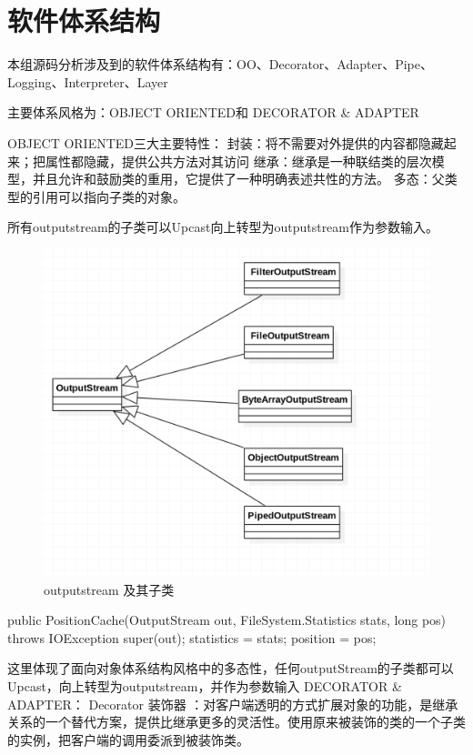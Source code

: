 \section{软件体系结构}
\label{sec:sa}

本组源码分析涉及到的软件体系结构有：OO、Decorator、Adapter、Pipe、Logging、Interpreter、Layer

主要体系风格为：OBJECT ORIENTED和 DECORATOR \& ADAPTER

OBJECT ORIENTED三大主要特性：
封装：将不需要对外提供的内容都隐藏起来；把属性都隐藏，提供公共方法对其访问
继承：继承是一种联结类的层次模型，并且允许和鼓励类的重用，它提供了一种明确表述共性的方法。
多态：父类型的引用可以指向子类的对象。

所有outputstream的子类可以Upcast向上转型为outputstream作为参数输入。
\begin{figure}[h]
\centering
\includegraphics[width =1\linewidth]{output.png}
\caption{outputstream 及其子类}
\label{fig:sa:OutputStream}
\end{figure}
\begin{java}
public PositionCache(OutputStream out,
                     FileSystem.Statistics stats,
                     long pos) throws IOException {
  super(out);
  statistics = stats;
  position = pos;
}
\end{java}
这里体现了面向对象体系结构风格中的多态性，任何outputStream的子类都可以Upcast，向上转型为outputstream，并作为参数输入
DECORATOR \& ADAPTER：
Decorator 装饰器 ：对客户端透明的方式扩展对象的功能，是继承关系的一个替代方案，提供比继承更多的灵活性。使用原来被装饰的类的一个子类的实例，把客户端的调用委派到被装饰类。
